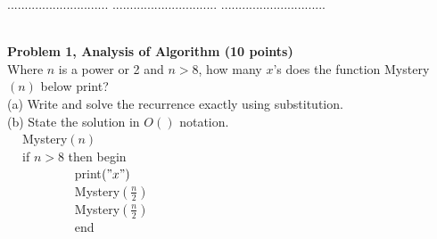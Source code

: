 \documentclass{article}
\begin{document}
\title{
}



\date{}


\newcommand{\DEF}[1]{{\em #1\/}}

\newcommand\chic{\chi_c}
\newcommand\C{\hbox{${\cal C}$}}
\newcommand{\RR}{\mbox{$\mathbb R$}}
\newcommand{\NN}{\mbox{$\mathbb N$}}
\newcommand{\ZZ}{\mbox{$\mathbb Z$}}
\newcommand{\eopf}{\raisebox{0.8ex}{\framebox{}}}
\newcommand{\dist}{\hbox{\rm d}}
\renewcommand\a{\alpha}
\renewcommand\b{\beta}
\renewcommand\c{\gamma}
\renewcommand\d{\delta}
\newcommand\D{\Delta}
\newcommand{\directedchi}{\mbox{$\vec{\chi}$}}
\newcommand{\directedE}{\mbox{$\vec{E}$}}
\newcommand{\directedG}{\mbox{$\vec{G}$}}
\newcommand{\directedK}{\mbox{$\vec{K}$}}

\newenvironment{proof}%
{\noindent{\bf Proof.}\ }%
{\hfill\eopf\par\bigskip}%




 $.............................$
 $..............................$
          $..............................$

\noindent
{}\\

\noindent
{\bf Problem 1, Analysis of Algorithm (10 points)}\\
Where $n$ is a power or 2 and $n > 8$, how many $x$'s does the function Mystery$(n)$ below print?\\
(a) Write and solve the recurrence exactly using substitution.\\
(b) State the solution in $O()$ notation. \\
$~~~~$ Mystery$(n)$\\
$~~~~$ if $n>8 $ then begin\\
$~~~~~~~~~~~~~~~~~~~~~~~$ print$("x")$\\
$~~~~~~~~~~~~~~~~~~~~~~~$ Mystery$\left(  \frac{n}{2}  \right)$\\
$~~~~~~~~~~~~~~~~~~~~~~~$ Mystery$\left(  \frac{n}{2}  \right)$\\
$~~~~~~~~~~~~~~~~~~~~~~~$ end\\
\end{document}
